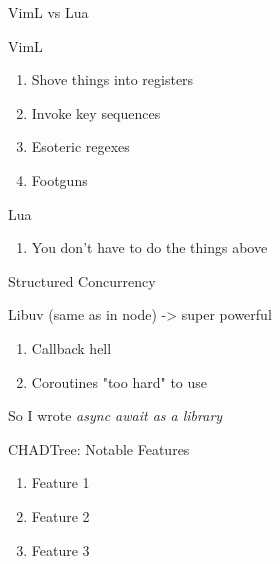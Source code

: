 \documentclass{beamer}
\begin{document}
\begin{frame}{VimL vs Lua}

	VimL

	\begin{enumerate}

		\item Shove things into registers

		\item Invoke key sequences

		\item Esoteric regexes

		\item Footguns


	\end{enumerate}


	Lua

	\begin{enumerate}

		\item You don't have to do the things above


	\end{enumerate}



\end{frame}


\begin{frame}{Structured Concurrency}

	Libuv (same as in node) -> super powerful


	\begin{enumerate}

		\item Callback hell

		\item Coroutines "too hard" to use

	\end{enumerate}


	So I wrote \em{async await} as a library


\end{frame}



\begin{frame}{CHADTree: Notable Features}


	\begin{enumerate}

		\item Feature 1

		\item Feature 2

		\item Feature 3

	\end{enumerate}


\end{frame}
\end{document}
